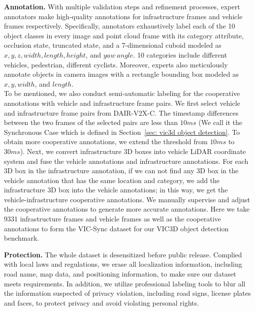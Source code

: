 \noindent \textbf{Annotation.}
With multiple validation steps and refinement processes, expert annotators make high-quality annotations for infrastructure frames and vehicle frames respectively.
Specifically, annotators exhaustively label each of the 10 object classes in every image and point cloud frame with its category attribute, occlusion state, truncated state, and a 7-dimensional cuboid modeled as $x, y, z, width, length, height$, and $yaw\ angle$. 
10 categories include different vehicles, pedestrian, different cyclists. 
Moreover, experts also meticulously annotate objects in camera images with a rectangle bounding box modeled as $x, y, width$, and $length$. \\
\indent To be mentioned, we also conduct semi-automatic labeling for the cooperative annotations with vehicle and infrastructure frame pairs.
We first select vehicle and infrastructure frame pairs from DAIR-V2X-C. The timestamp differences between the two frames of the selected pairs are less than $10ms$ (We call it the Synchronous Case which is defined in Section~\ref{sec: vic3d object detection}. To obtain more cooperative annotations, we 
extend the threshold from $10ms$ to $30ms$).
Next, we convert infrastructure 3D boxes into vehicle LiDAR coordinate system and fuse the vehicle annotations and infrastructure annotations. 
For each 3D box in the infrastructure annotation, if we can not find any 3D box in the vehicle annotation that has the same location and category, we add the infrastructure 3D box into the vehicle annotations; in this way, we get the vehicle-infrastructure cooperative annotations.
We manually supervise and adjust the cooperative annotations to generate more accurate annotations.
Here we take 9331 infrastructure frames and vehicle frames as well as the cooperative annotations to form the VIC-Sync dataset for our VIC3D object detection benchmark. 

\noindent \textbf{Protection.}
The whole dataset is desensitized before public release. Complied with local laws and regulations, we erase all localization information, including road name, map data, and positioning information, to make sure our dataset meets requirements. In addition, we utilize professional labeling tools to blur all the information suspected of privacy violation, including road signs, license plates and faces, to protect  privacy and avoid violating personal rights. 